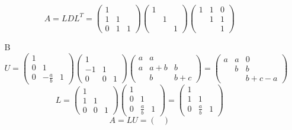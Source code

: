 \documentclass[english,onecolumn]{IEEEtran}
\begin{document}
\begin{enumerate}
\begin{itemize}
    	$$A=LDL^T =\begin{pmatrix}
    	1 &  &  \\ 
    	1& 1 &  \\ 
    	0 & 1 & 1
    	\end{pmatrix}\begin{pmatrix}
    	1 &  &  \\ 
    	& 1 &  \\ 
    	&  & 1
    	\end{pmatrix} \begin{pmatrix}
    	1 &1  &0  \\ 
    	& 1 & 1 \\ 
    	&  & 1
    	\end{pmatrix}$$
    	\item [B] 
    	$$U=\begin{pmatrix}
    	1 &  &  \\ 
    	0& 1 &  \\ 
    	0&  -\frac{a}{b}& 1\end{pmatrix}
    	\begin{pmatrix}
    	1 &  &  \\ 
    	-1& 1 &  \\ 
    	0&  0& 1\end{pmatrix}
    	\begin{pmatrix}
    	a &a  &  \\ 
    	a& a+b &b  \\ 
    	&  b& b+c\end{pmatrix}=    	\begin{pmatrix}
    	a & a & 0 \\ 
    	& b &  b\\ 
    	& & b+c-a\end{pmatrix}$$
    	$$L=    	\begin{pmatrix}
    	1 &  &  \\ 
    	1& 1 &  \\ 
    	0&  0& 1\end{pmatrix}    	\begin{pmatrix}
    	1 &  &  \\ 
    	0& 1 &  \\ 
    	0& \frac{a}{b}& 1\end{pmatrix}=    	\begin{pmatrix}
    	1 &  &  \\ 
    	1& 1 &  \\ 
    	0&  \frac{a}{b}& 1\end{pmatrix}$$
    	$$A = LU = \begin{pmatrix}

\end{pmatrix}$$
\end{itemize}
\end{enumerate}
\end{document}

